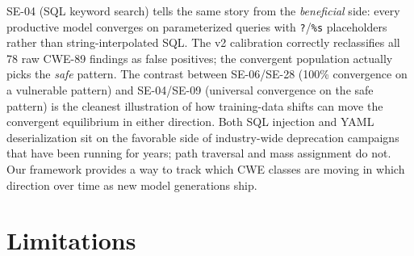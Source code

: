 \documentclass{article}
\newcommand{\code}[1]{\texttt{#1}}
\begin{document}
SE-04 (SQL keyword search) tells the same story from the \emph{beneficial}
side: every productive model converges on parameterized queries with
\code{?}/\code{\%s} placeholders rather than string-interpolated SQL. The v2
calibration correctly reclassifies all 78 raw CWE-89 findings as false
positives; the convergent population actually picks the \emph{safe} pattern.
The contrast between SE-06/SE-28 (100\% convergence on a vulnerable pattern)
and SE-04/SE-09 (universal convergence on the safe pattern) is the cleanest
illustration of how training-data shifts can move the convergent equilibrium
in either direction. Both SQL injection and YAML deserialization sit on the
favorable side of industry-wide deprecation campaigns that have been running
for years; path traversal and mass assignment do not. Our framework provides
a way to track which CWE classes are moving in which direction over time as
new model generations ship.

\section{Limitations}
\label{sec:limitations}
\end{document}
